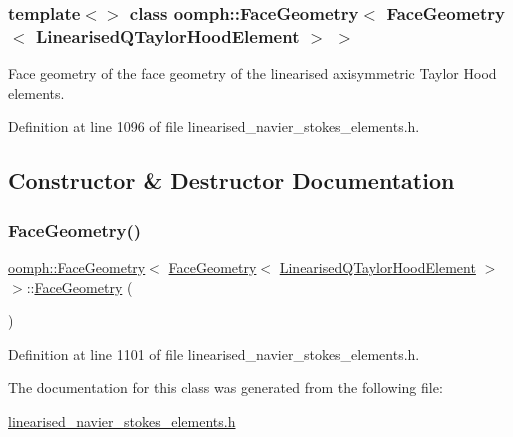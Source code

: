 \subsubsection*{template$<$$>$\newline
class oomph\+::\+Face\+Geometry$<$ Face\+Geometry$<$ Linearised\+Q\+Taylor\+Hood\+Element $>$ $>$}

Face geometry of the face geometry of the linearised axisymmetric Taylor Hood elements. 

Definition at line 1096 of file linearised\+\_\+navier\+\_\+stokes\+\_\+elements.\+h.



\subsection{Constructor \& Destructor Documentation}
\mbox{\label{classoomph_1_1FaceGeometry_3_01FaceGeometry_3_01LinearisedQTaylorHoodElement_01_4_01_4_a9ed8ce2c18553c1312e565db942f3b2b}} 
\subsubsection{\texorpdfstring{Face\+Geometry()}{FaceGeometry()}}
{\footnotesize\ttfamily \hyperlink{classoomph_1_1FaceGeometry}{oomph\+::\+Face\+Geometry}$<$ \hyperlink{classoomph_1_1FaceGeometry}{Face\+Geometry}$<$ \hyperlink{classoomph_1_1LinearisedQTaylorHoodElement}{Linearised\+Q\+Taylor\+Hood\+Element} $>$ $>$\+::\hyperlink{classoomph_1_1FaceGeometry}{Face\+Geometry} (\begin{DoxyParamCaption}{ }\end{DoxyParamCaption})\hspace{0.3cm}{\ttfamily [inline]}}



Definition at line 1101 of file linearised\+\_\+navier\+\_\+stokes\+\_\+elements.\+h.



The documentation for this class was generated from the following file\+:\begin{DoxyCompactItemize}
\item 
\hyperlink{linearised__navier__stokes__elements_8h}{linearised\+\_\+navier\+\_\+stokes\+\_\+elements.\+h}\end{DoxyCompactItemize}
